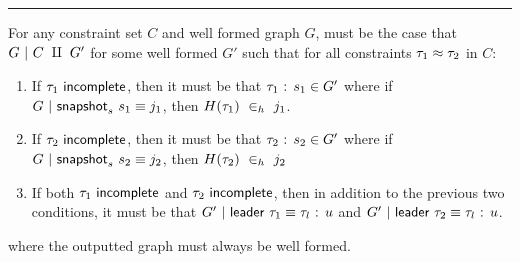 \noindent\rule{\textwidth}{1pt}






\begin{theorem}[name=Unified Graph Correctness]
For any constraint set $C$ and well formed graph $G$, must be the case that $G~|~C~\amalg~G'$ for some well formed $G'$ such that for all constraints ${\tau_1} \approx {\tau_2}$ in $C$:
    \begin{enumerate}
        \item If $\tau_1 ~ \normalfont\textsf{incomplete}$, then it must be that $\tau_1\normalfont\textsf{ : }s_1 \in G'$ where if $G~|~\normalfont\textsf{snapshot}_s~s_1 \equiv j_1$, then $H(\tau_1) ~\in_{h}~ j_1$. 
        \item If $\tau_2 ~ \normalfont\textsf{incomplete}$, then it must be that $\tau_2\normalfont\textsf{ : }s_2 \in G'$ where if $G~|~\normalfont\textsf{snapshot}_s~s_2 \equiv j_2$, then $H(\tau_2) ~\in_{h}~ j_2$
        \item If both $\tau_1 ~ \normalfont\textsf{incomplete}$ and $\tau_2 ~ \normalfont\textsf{incomplete}$, then in addition to the previous two conditions, it must be that $G'~|~\normalfont\textsf{leader}~\tau_1 \equiv \tau_l\normalfont\textsf{ : }u$ and $G'~|~\normalfont\textsf{leader}~\tau_2 \equiv \tau_l\normalfont\textsf{ : }u$.
    \end{enumerate}
where the outputted graph must always be well formed.
\end{theorem}

